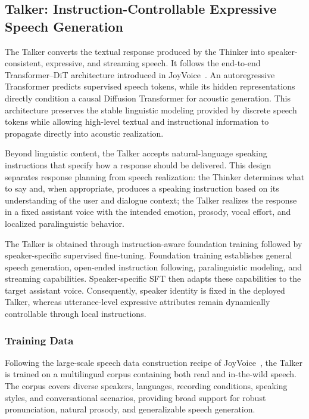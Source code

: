 \subsection{Talker: Instruction-Controllable Expressive Speech Generation}
The Talker converts the textual response produced by the Thinker into
speaker-consistent, expressive, and streaming speech. It follows the
end-to-end Transformer--DiT architecture introduced in
JoyVoice~\cite{joyvoice}. An autoregressive Transformer predicts supervised
speech tokens, while its hidden representations directly condition a causal
Diffusion Transformer for acoustic generation. This architecture preserves the
stable linguistic modeling provided by discrete speech tokens while allowing
high-level textual and instructional information to propagate directly into
acoustic realization.

Beyond linguistic content, the Talker accepts natural-language speaking
instructions that specify how a response should be delivered. This design
separates response planning from speech realization: the Thinker determines
what to say and, when appropriate, produces a speaking instruction based on
its understanding of the user and dialogue context; the Talker realizes the
response in a fixed assistant voice with the intended emotion, prosody, vocal
effort, and localized paralinguistic behavior.

The Talker is obtained through instruction-aware foundation training followed
by speaker-specific supervised fine-tuning. Foundation training establishes
general speech generation, open-ended instruction following, paralinguistic
modeling, and streaming capabilities. Speaker-specific SFT then adapts these
capabilities to the target assistant voice. Consequently, speaker identity is
fixed in the deployed Talker, whereas utterance-level expressive attributes
remain dynamically controllable through local instructions.


\subsubsection{Training Data}

Following the large-scale speech data construction recipe of
JoyVoice~\cite{joyvoice}, the Talker is trained on a multilingual corpus
containing both read and in-the-wild speech. The corpus covers diverse
speakers, languages, recording conditions, speaking styles, and conversational
scenarios, providing broad support for robust pronunciation, natural prosody,
and generalizable speech generation.

